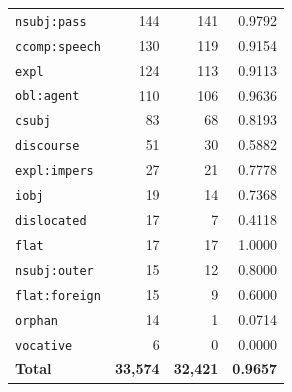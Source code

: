 \begin{table}[ht]
\begin{tabular}{lrrr}
\texttt{nsubj\!:\!pass} & 144 & 141 & 0.9792 \\
\texttt{ccomp\!:\!speech} & 130 & 119 & 0.9154 \\
\texttt{expl} & 124 & 113 & 0.9113 \\
\texttt{obl\!:\!agent} & 110 & 106 & 0.9636 \\
\texttt{csubj} & 83 & 68 & 0.8193 \\
\texttt{discourse} & 51 & 30 & 0.5882 \\
\texttt{expl\!:\!impers} & 27 & 21 & 0.7778 \\
\texttt{iobj} & 19 & 14 & 0.7368 \\
\texttt{dislocated} & 17 & 7 & 0.4118 \\
\texttt{flat} & 17 & 17 & 1.0000 \\
\texttt{nsubj\!:\!outer} & 15 & 12 & 0.8000 \\
\texttt{flat\!:\!foreign} & 15 & 9 & 0.6000 \\
\texttt{orphan} & 14 & 1 & 0.0714 \\
\texttt{vocative} & 6 & 0 & 0.0000 \\
\midrule
\textbf{Total} & \textbf{33,574} & \textbf{32,421} & \textbf{0.9657} \\
\bottomrule
\end{tabular}
\end{table}
